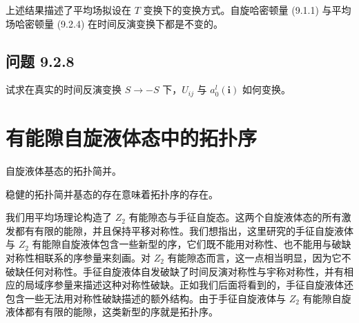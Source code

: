

上述结果描述了平均场拟设在 $T$ 变换下的变换方式。自旋哈密顿量 (9.1.1) 与平均场哈密顿量 (9.2.4) 在时间反演变换下都是不变的。

\subsection*{问题 9.2.8}

试求在真实的时间反演变换 $S\to-S$ 下，$U_{ij}$ 与 $a_0^l(\pmb{i})$ 如何变换。

\section{有能隙自旋液体态中的拓扑序}

\begin{keypoints}
\item 自旋液体基态的拓扑简并。
\item 稳健的拓扑简并基态的存在意味着拓扑序的存在。
\end{keypoints}

我们用平均场理论构造了 $Z_2$ 有能隙态与手征自旋态。这两个自旋液体态的所有激发都有有限的能隙，并且保持平移对称性。我们想指出，这里研究的手征自旋液体与 $Z_2$ 有能隙自旋液体包含一些新型的序，它们既不能用对称性、也不能用与破缺对称性相联系的序参量来刻画。对 $Z_2$ 有能隙态而言，这一点相当明显，因为它不破缺任何对称性。手征自旋液体自发破缺了时间反演对称性与宇称对称性，并有相应的局域序参量来描述这种对称性破缺。正如我们后面将看到的，手征自旋液体还包含一些无法用对称性破缺描述的额外结构。由于手征自旋液体与 $Z_2$ 有能隙自旋液体都有有限的能隙，这类新型的序就是拓扑序。

